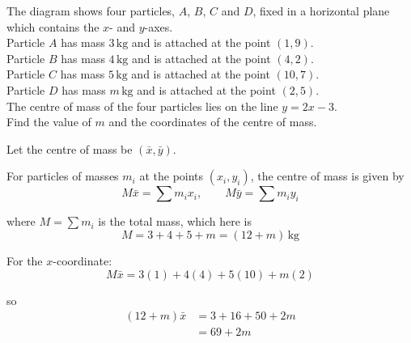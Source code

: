 \documentclass[leqno]{article}
\begin{document}
\begin{enumerate}[
  label=\textbf{\arabic*.},
  leftmargin=*,
  topsep=0pt,
  partopsep=0pt,
  parsep=0pt
]
\begin{figure}[H]
\end{figure}


The diagram shows four particles, $A$, $B$, $C$ and $D$, fixed in a horizontal plane which contains the $x$- and $y$-axes. \\

Particle $A$ has mass $3\,\mathrm{kg}$ and is attached at the point $(1, 9)$. \\
Particle $B$ has mass $4\,\mathrm{kg}$ and is attached at the point $(4, 2)$. \\
Particle $C$ has mass $5\,\mathrm{kg}$ and is attached at the point $(10, 7)$. \\
Particle $D$ has mass $m\,\mathrm{kg}$ and is attached at the point $(2, 5)$. \\

The centre of mass of the four particles lies on the line $y = 2x - 3$. \\
Find the value of $m$ and the coordinates of the centre of mass.  \\

\vspace*{10pt}

\begin{djsSolution}
Let the centre of mass be \((\bar{x},\bar{y})\).

For particles of masses \(m_i\) at the points \((x_i,y_i)\), the centre of mass is given by
\[
M\bar{x}=\sum m_ix_i,\qquad M\bar{y}=\sum m_iy_i
\]

where \(M=\sum m_i\) is the total mass, which here is
\[
M=3+4+5+m=(12+m)\,\mathrm{kg}
\]

For the \(x\)-coordinate:
\[
M\bar{x}=3(1)+4(4)+5(10)+m(2)
\]

so
\begin{align*}
(12+m)\bar{x}&=3+16+50+2m\\
&=69+2m
\end{align*}


\end{djsSolution}
\end{enumerate}
\end{document}
